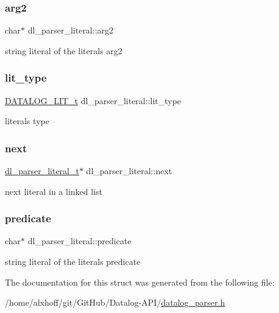 \subsubsection{\texorpdfstring{arg2}{arg2}}
{\footnotesize\ttfamily char$\ast$ dl\+\_\+parser\+\_\+literal\+::arg2}

string literal of the literal\textquotesingle{}s arg2 \mbox{\label{structdl__parser__literal_a8e4ab2c8fdcdf404c30069f9abd12544}} 
\subsubsection{\texorpdfstring{lit\+\_\+type}{lit\_type}}
{\footnotesize\ttfamily \hyperlink{datalog__api_8h_ad27ac7b01e9690a8c6d1bd37e131a421}{D\+A\+T\+A\+L\+O\+G\+\_\+\+L\+I\+T\+\_\+t} dl\+\_\+parser\+\_\+literal\+::lit\+\_\+type}

literal\textquotesingle{}s type \mbox{\label{structdl__parser__literal_af1e52e4932e62608901b911045b566b7}} 
\subsubsection{\texorpdfstring{next}{next}}
{\footnotesize\ttfamily \hyperlink{datalog__parser_8h_adaef2eede58b9f7698925f7194af1373}{dl\+\_\+parser\+\_\+literal\+\_\+t}$\ast$ dl\+\_\+parser\+\_\+literal\+::next}

next literal in a linked list \mbox{\label{structdl__parser__literal_a29b6704d93332f103bd46525b651c62e}} 
\subsubsection{\texorpdfstring{predicate}{predicate}}
{\footnotesize\ttfamily char$\ast$ dl\+\_\+parser\+\_\+literal\+::predicate}

string literal of the literal\textquotesingle{}s predicate 

The documentation for this struct was generated from the following file\+:\begin{DoxyCompactItemize}
\item 
/home/alxhoff/git/\+Git\+Hub/\+Datalog-\/\+A\+P\+I/\hyperlink{datalog__parser_8h}{datalog\+\_\+parser.\+h}\end{DoxyCompactItemize}
